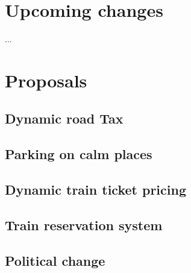 \section{Upcoming changes}
...
\section{Proposals}
\subsection{Dynamic road Tax}
\subsection{Parking on calm places}
\subsection{Dynamic train ticket pricing}
\subsection{Train reservation system}
\subsection{Political change}

